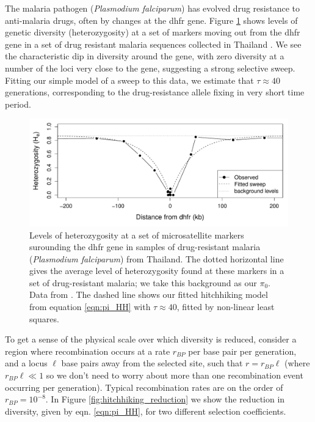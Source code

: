 The malaria pathogen ({\it Plasmodium falciparum}) has
evolved drug resistance to anti-malaria drugs, often by changes at
the dhfr gene. Figure \ref{fig:hitchhiking_malaria} shows levels of
genetic diversity (heterozygosity) at a set of markers moving out from the dhfr gene in a
set of  drug resistant malaria sequences collected in
Thailand \citep{nash2005selection}. We see the characteristic dip in diversity around the gene,
with zero diversity at a number of the loci very close to the gene,
suggesting a strong selective sweep. Fitting our simple model of a
sweep to this data,  we estimate that $\tau \approx 40$ generations,
corresponding to the drug-resistance allele fixing in very short time period. 

\begin{figure}
\begin{center}
\includegraphics[width=\textwidth]{Journal_figs/recom_selection/malaria_sweep/dhfr_sweep.pdf}
\end{center}
\caption{Levels of heterozygosity at a set of microsatellite markers
  surounding the dhfr gene in samples of drug-resistant malaria ({\it Plasmodium falciparum}) from
  Thailand. The dotted horizontal line gives the average level of
  heterozygosity found at these markers in a set of drug-resistant
  malaria; we take this background as our $\pi_0$. Data from \citet{nash2005selection}. The dashed line shows
  our fitted hitchhiking model from equation \ref{eqn:pi_HH} with $\tau \approx 40$, fitted by
  non-linear least squares. } \label{fig:hitchhiking_malaria}
\end{figure}


To get a sense of the physical scale over which diversity is reduced,
consider a region where recombination occurs at a rate $r_{BP}$ per
base pair per generation, and a locus $ \ell $ base pairs away from the
selected site, such that $r=r_{BP } \ell $ (where $r_{BP}  \ell  \ll 1$ so we don't need to
worry about more than one recombination event occurring per
generation). Typical
recombination rates are on the order of $r_{BP} = 10^{-8}$. In Figure
\ref{fig:hitchhiking_reduction} we show the reduction in diversity,
given by eqn. \eqref{eqn:pi_HH}, for two different selection coefficients.\\ 

